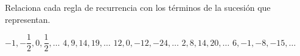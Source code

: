Relaciona cada regla de recurrencia con los términos de la sucesión que representan.

\begin{multicols}{2}
    \begin{choices}
        \choice $-1, -\dfrac{1}{2}, 0, \dfrac{1}{2},\dots $
        \choice $4, 9, 14, 19, \dots$
        \choice $12, 0, -12, -24, \dots$
        \choice $2, 8, 14, 20, \dots$
        \choice $6, -1, -8, -15, \dots$
    \end{choices}
    \columnbreak
\end{multicols}